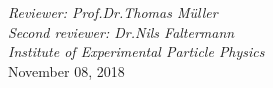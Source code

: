 \begin{titlepage}
\begin{addmargin}[1.5cm]{0cm}
\begin{center}
{  %
  \large{\textit{Reviewer: Prof.\;Dr.\;Thomas Müller}}\\
  \large{\textit{Second reviewer: Dr.\;Nils Faltermann}}\\
   \vspace{0.2 cm}
\large{\textit{Institute of Experimental Particle Physics}}\\


  \vspace{1.0cm}
  \large{November 08, 2018}%
}
\end{center}
\end{addmargin}
\end{titlepage}
